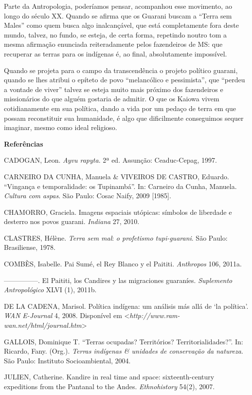 Parte da Antropologia, poderíamos pensar, acompanhou esse movimento, ao
longo do século XX. Quando se afirma que os Guarani buscam a ``Terra sem
Males'' como quem busca algo inalcançável, que está completamente fora
deste mundo, talvez, no fundo, se esteja, de certa forma, repetindo
noutro tom a mesma afirmação enunciada reiteradamente pelos fazendeiros
de MS: que recuperar as terras para os indígenas é, ao final,
absolutamente impossível.

Quando se projeta para o campo da transcendência o projeto político
guarani, quando se lhes atribui o epíteto de povo ``melancólico e
pessimista'', que ``perdeu a vontade de viver'' talvez se esteja muito
mais próximo dos fazendeiros e missionários do que alguém gostaria de
admitir. O que os Kaiowa vivem cotidianamente em sua política, dando a
vida por um pedaço de terra em que possam reconstituir sua humanidade, é
algo que dificilmente conseguimos sequer imaginar, mesmo como ideal
religioso.

\textbf{Referências}

CADOGAN, Leon. \emph{Ayvu rapyta}. 2ª ed. Assunção: Ceaduc-Cepag, 1997.

CARNEIRO DA CUNHA, Manuela \& VIVEIROS DE CASTRO, Eduardo. ``Vingança e
temporalidade: os Tupinambá''. In: Carneiro da Cunha, Manuela.
\emph{Cultura com aspas}. São Paulo: Cosac Naify, 2009 {[}1985{]}.

CHAMORRO, Graciela. Imagens espaciais utópicas: símbolos de liberdade e
desterro nos povos guarani. \emph{Indiana} 27, 2010.

CLASTRES, Hélène. \emph{Terra sem mal}: \emph{o profetismo
tupi-guarani}. São Paulo: Brasiliense, 1978.

COMBÈS, Isabelle. Pai Sumé, el Rey Blanco y el Paititi. \emph{Anthropos}
106, 2011a.

---------------. El Paititi, los Candires y las migraciones guaraníes.
\emph{Suplemento Antropológico} XLVI (1), 2011b.

DE LA CADENA, Marisol. Política indígena: um análisis más allá de `la
política'. \emph{WAN E-Journal} 4, 2008. Disponível em
\textless{}\emph{http://www.ram-wan.net/html/journal.htm}\textgreater{}

GALLOIS, Dominique T. ``Terras ocupadas? Territórios?
Territorialidades?''. In: Ricardo, Fany. (Org.). \emph{Terras indígenas
\& unidades de conservação da natureza}. São Paulo: Instituto
Socioambiental, 2004.

JULIEN, Catherine. Kandire in real time and space: sixteenth-century
expeditions from the Pantanal to the Andes. \emph{Ethnohistory} 54(2),
2007.

